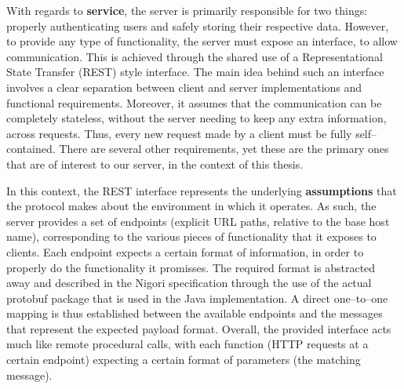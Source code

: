 With regards to \textbf{service}, the server is primarily responsible for two things: properly authenticating users and safely storing their respective data.
However, to provide any type of functionality, the server must expose an interface, to allow communication.
This is achieved through the shared use of a Representational State Transfer (REST) \cite{REST} style interface.
The main idea behind such an interface involves a clear separation between client and server implementations and functional requirements.
Moreover, it assumes that the communication can be completely stateless, without the server needing to keep any extra information, across requests.
Thus, every new request made by a client must be fully self--contained.
There are several other requirements, yet these are the primary ones that are of interest to our server, in the context of this thesis.

In this context, the REST interface represents the underlying \textbf{assumptions} that the protocol makes about the environment in which it operates.
As such, the server provides a set of endpoints (explicit URL paths, relative to the base host name), corresponding to the various pieces of functionality that it exposes to clients.
Each endpoint expects a certain format of information, in order to properly do the functionality it promisses.
The required format is abstracted away and described in the Nigori specification through the use of the actual protobuf \cite{protobuf} package that is used in the Java implementation.
A direct one--to--one mapping is thus established between the available endpoints and the messages that represent the expected payload format.
Overall, the provided interface acts much like remote procedural calls, with each function (HTTP requests at a certain endpoint) expecting a certain format of parameters (the matching message).

